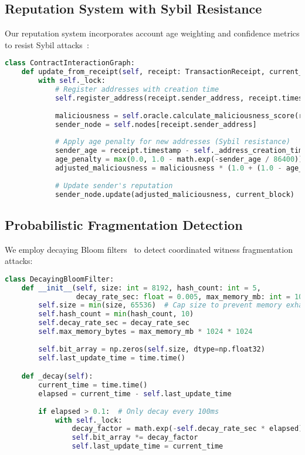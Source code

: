 \documentclass{article}
\begin{document}
\subsection{Reputation System with Sybil Resistance}

Our reputation system incorporates account age weighting and confidence metrics to resist Sybil attacks~\cite{douceur2002sybil}:

\begin{lstlisting}[language=Python,caption={Sybil-Resistant Reputation System},label={lst:reputation}]
class ContractInteractionGraph:
    def update_from_receipt(self, receipt: TransactionReceipt, current_block: int):
        with self._lock:
            # Register addresses with creation time
            self.register_address(receipt.sender_address, receipt.timestamp)
            
            maliciousness = self.oracle.calculate_maliciousness_score(receipt)
            sender_node = self.nodes[receipt.sender_address]
            
            # Apply age penalty for new addresses (Sybil resistance)
            sender_age = receipt.timestamp - self._address_creation_times[receipt.sender_address]
            age_penalty = max(0.0, 1.0 - math.exp(-sender_age / 86400))  # 1 day half-life
            adjusted_maliciousness = maliciousness * (1.0 + (1.0 - age_penalty) * 0.5)
            
            # Update sender's reputation
            sender_node.update(adjusted_maliciousness, current_block)
\end{lstlisting}

\subsection{Probabilistic Fragmentation Detection}

We employ decaying Bloom filters~\cite{bloom1970space} to detect coordinated witness fragmentation attacks:

\begin{lstlisting}[language=Python,caption={Decaying Bloom Filter for Pattern Detection},label={lst:bloom}]
class DecayingBloomFilter:
    def __init__(self, size: int = 8192, hash_count: int = 5, 
                 decay_rate_sec: float = 0.005, max_memory_mb: int = 10):
        self.size = min(size, 65536)  # Cap size to prevent memory exhaustion
        self.hash_count = min(hash_count, 10)
        self.decay_rate_sec = decay_rate_sec
        self.max_memory_bytes = max_memory_mb * 1024 * 1024
        
        self.bit_array = np.zeros(self.size, dtype=np.float32)
        self.last_update_time = time.time()

    def _decay(self):
        current_time = time.time()
        elapsed = current_time - self.last_update_time
        
        if elapsed > 0.1:  # Only decay every 100ms
            with self._lock:
                decay_factor = math.exp(-self.decay_rate_sec * elapsed)
                self.bit_array *= decay_factor
                self.last_update_time = current_time
\end{lstlisting}
\end{document}
